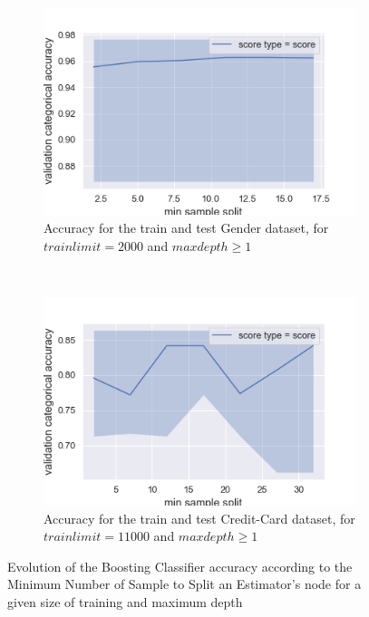 \documentclass[10pt]{article}
\begin{document}
			\begin{figure}[h]
				\centering
				\begin{subfigure}[]{0.45\columnwidth}
					\centering
					\includegraphics[width=\linewidth]{../graphics/boost_gender_min_sample_split_score_type_score_type.png}
					\caption{Accuracy for the train and test Gender dataset, for $trainlimit=2000$ and $maxdepth\ge1$}
					\label{boost:g_train_vs_test_ms}
				\end{subfigure}
				~
				\begin{subfigure}[]{0.45\columnwidth}
					\centering
					\includegraphics[width=\linewidth]{../graphics/boost_creditcard_min_sample_split_score_type_score_type.png}
					\caption{Accuracy for the train and test Credit-Card dataset, for $trainlimit=11000$ and $maxdepth\geq1$}
					\label{boost:cc_train_vs_test_ms}
				\end{subfigure}
				\caption{Evolution of the Boosting Classifier accuracy according to the Minimum Number of Sample to Split an Estimator's node for a given size of training and maximum depth}
				\label{boost:train_vs_test_ms}
			\end{figure}
\end{document}
